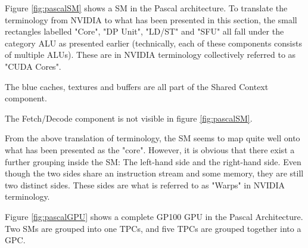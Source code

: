 Figure \ref{fig:pascalSM} shows a \gls{SM} in the Pascal architecture.
To translate the terminology from NVIDIA to what has been presented in this section, the small rectangles labelled "Core", "DP Unit", "LD/ST" and "SFU" all fall under the category \gls{ALU} as presented earlier (technically, each of these components consists of multiple \glspl{ALU}).
These are in NVIDIA terminology collectively referred to as "CUDA Cores".

The blue caches, textures and buffers are all part of the Shared Context component.

The Fetch/Decode component is not visible in figure \ref{fig:pascalSM}.

From the above translation of terminology, the \gls{SM} seems to map quite well onto what has been presented as the "core".
However, it is obvious that there exist a further grouping inside the \gls{SM}: The left-hand side and the right-hand side.
Even though the two sides share an instruction stream and some memory, they are still two distinct sides.
These sides are what is referred to as "Warps" in NVIDIA terminology.


Figure \ref{fig:pascalGPU} shows a complete GP100 GPU in the Pascal Architecture.
Two \glspl{SM} are grouped into one \glspl{TPC}, and five \glspl{TPC} are grouped together into a \gls{GPC}. \\


